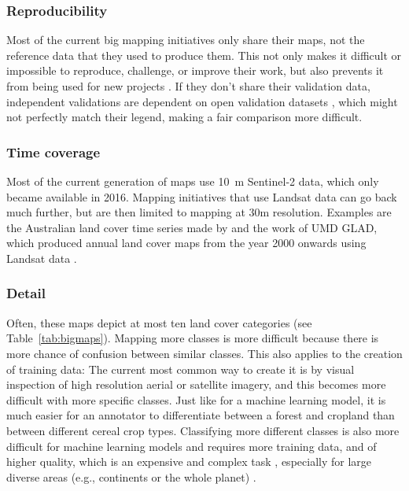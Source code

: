     \subsubsection{Reproducibility}
        Most of the current big mapping initiatives only share their maps, not the reference data that they used to produce them. This not only makes it difficult or impossible to reproduce, challenge, or improve their work, but also prevents it from being used for new projects \citep{tsendbazar2015assessing}. If they don't share their validation data, independent validations are dependent on open validation datasets \citep{venter2022global}, which might not perfectly match their legend, making a fair comparison more difficult.
    
    \subsubsection{Time coverage} 
        Most of the current generation of maps use 10~m Sentinel-2 data, which only became available in 2016. Mapping initiatives that use Landsat data can go back much further, but are then limited to mapping at 30m resolution. Examples are the Australian land cover time series made by \citep{calderon2021high} and the work of UMD GLAD, which produced annual land cover maps from the year 2000 onwards using Landsat data \citep{hansen2022global}. 

    \subsubsection{Detail}
        Often, these maps depict at most ten land cover categories (see Table~\ref{tab:bigmaps}). Mapping more classes is more difficult because there is more chance of confusion between similar classes. This also applies to the creation of training data: The current most common way to create it is by visual inspection of high resolution aerial or satellite imagery, and this becomes more difficult with more specific classes. Just like for a machine learning model, it is much easier for an annotator to differentiate between a forest and cropland than between different cereal crop types. Classifying more different classes is also more difficult for machine learning models and requires more training data, and of higher quality, which is an expensive and complex task \citep{li2021improving}, especially for large diverse areas (e.g., continents or the whole planet) \citep{tsendbazar2021towards,stanimirova2023global}. 

